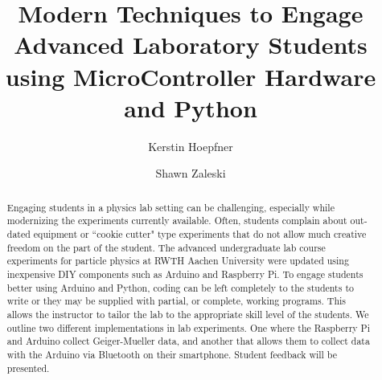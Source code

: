 \documentclass[12pt]{article}
\title{\textbf{Modern Techniques to Engage Advanced Laboratory Students using MicroController Hardware and Python}}
\author[1]{Kerstin Hoepfner}
\author[1]{Shawn Zaleski}
\affil[1]{III Physikalisches Institut A RWTH Aachen University}
\date{\empty}
\begin{document}
\maketitle
\noindent
\newline

\begin{abstract}
Engaging students in a physics lab setting can be challenging, especially while modernizing the experiments currently available. Often, students complain about out-dated equipment or ``cookie cutter" type experiments that do not allow much creative freedom on the part of the student. The advanced undergraduate lab course experiments for particle physics at RWTH Aachen University were updated using inexpensive DIY components such as Arduino and Raspberry Pi. To engage students better using Arduino and Python, coding can be left completely to the students to write or they may be supplied with partial, or complete, working programs. This allows the instructor to tailor the lab to the appropriate skill level of the students. We outline two different implementations in lab experiments. One where the Raspberry Pi and Arduino collect Geiger-Mueller data, and another that allows them to collect data with the Arduino via Bluetooth on their smartphone. Student feedback will be presented.

\end{abstract}

\newpage








\end{document}

